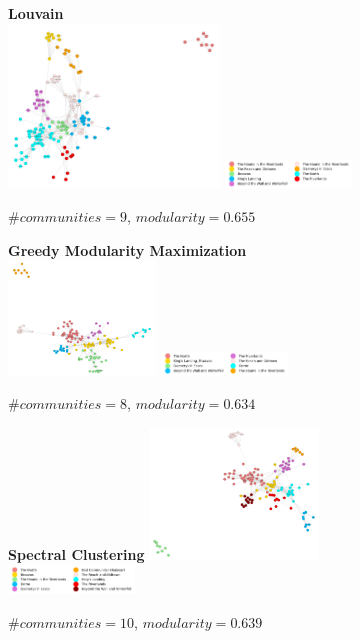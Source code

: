 \documentclass[10pt,twocolumn,letterpaper]{article}
\begin{document}
\begin{figure}[!h]
    \centering
    \textbf{Louvain} \\
    \includegraphics[width=0.5\textwidth]{img/s6/communities_louvain.jpg}
    \includegraphics[width=0.3\textwidth]{img/s6/louvain_legend.jpg}\\
    \caption{\small{$\#communities=9$, $modularity=0.655$}}
    \label{fig:louvain_s6}
    \vspace{1.5cm}
\end{figure}



\begin{figure}[!h]
    \centering
    \textbf{Greedy Modularity Maximization}\\
    \includegraphics[width=0.35\textwidth]{img/s6/communities_gmm.jpg}
    \includegraphics[width=0.3\textwidth]{img/s6/gmm_legend.jpg}\\
    \caption{\small{$\#communities=8$, $modularity=0.634$}}
    \label{fig:gmm_s6}
\end{figure}

\begin{figure}[!h]
    \centering
    \textbf{Spectral Clustering}
    \includegraphics[width=0.4\textwidth]{img/s6/communities_sc.jpg}
    \includegraphics[width=0.3\textwidth]{img/s6/sc_legend.jpg}\\
    \caption{\small{$\#communities=10$, $modularity=0.639$}}
    \label{fig:sc_s6}
\end{figure}
\end{document}
